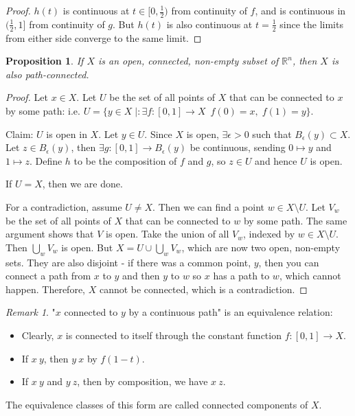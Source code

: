 \documentclass{article}
\theoremstyle{definition}
\theoremstyle{plain}%
\newtheorem{prop}[thm]{Proposition}
\theoremstyle{remark}
\newtheorem*{rem}{Remark}
\newcommand{\union}{\cup}
\newcommand{\Union}{\bigcup}
\newcommand{\R}{\mathbb{R}}
\begin{document}
\begin{proof}
    $h(t)$ is continuous at $t \in [0,\frac{1}{2})$ from continuity of $f$, and is continuous in $(\frac{1}{2}, 1]$ from continuity of $g$. But $h(t)$ is also continuous at $t = \frac{1}{2}$ since the limits from either side converge to the same limit.
\end{proof}

\begin{prop}
    If $X$ is an open, connected, non-empty subset of $\R^n$, then $X$ is also path-connected.
\end{prop}

\begin{proof}
    Let $x \in X$. Let $U$ be the set of all points of $X$ that can be connected to $x$ by some path: i.e. $U = \{y \in X \; | : \exists f : [0,1] \to X\ \; f(0) = x, \; f(1) = y \}$.
    
    Claim: $U$ is open in $X$. Let $y \in U$. Since $X$ is open, $\exists \epsilon > 0$ such that $B_\epsilon (y) \subset X$. Let $z \in B_\epsilon (y)$, then $\exists g : [0,1] \to B_\epsilon (y)$ be continuous, sending $0 \mapsto y$ and $1 \mapsto z$. Define $h$ to be the composition of $f$ and $g$, so $z \in U$ and hence $U$ is open.
    
    If $U = X$, then we are done.
    
    For a contradiction, assume $U \ne X$. Then we can find a point $w \in X \setminus U$. Let $V_w$ be the set of all points of $X$ that can be connected to $w$ by some path. The same argument shows that $V$ is open. Take the union of all $V_w$, indexed by $w \in X \setminus U$. Then $\Union_w V_w$ is open. But $X = U \union \Union_w V_w$, which are now two open, non-empty sets. They are also disjoint - if there was a common point, $y$, then you can connect a path from $x$ to $y$ and then $y$ to $w$ so $x$ has a path to $w$, which cannot happen. Therefore, $X$ cannot be connected, which is a contradiction.
\end{proof}

\begin{rem}
    "$x$ connected to $y$ by a continuous path" is an equivalence relation:
    \begin{itemize}
        \item Clearly, $x$ is connected to itself through the constant function $f : [0,1] \to X$.
        \item If $x ~ y$, then $y ~ x$ by $f(1-t)$.
        \item If $x ~ y$ and $y ~ z$, then by composition, we have $x ~ z$.
    \end{itemize}
    
    The equivalence classes of this form are called connected components of $X$.
\end{rem}
\end{document}
